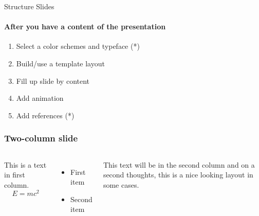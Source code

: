 \begin{frame}{Structure Slides}
    \framesubtitle{After you have a content of the presentation}
    \begin{enumerate}
        \item Select a color schemes and typeface (*) \pause
        \item Build/use a template layout \pause
        \item Fill up slide by content \pause
        \item Add animation \pause
        \item Add references (*)
    \end{enumerate}

\end{frame}


\begin{frame}
    \frametitle{Two-column slide}
    \begin{columns}
        This is a text in first column.
        $$E=mc^2$$
        \begin{itemize}
            \item First item
            \item Second item
        \end{itemize}

        This text will be in the second column
        and on a second thoughts, this is a nice looking
        layout in some cases.
    \end{columns}
\end{frame}

